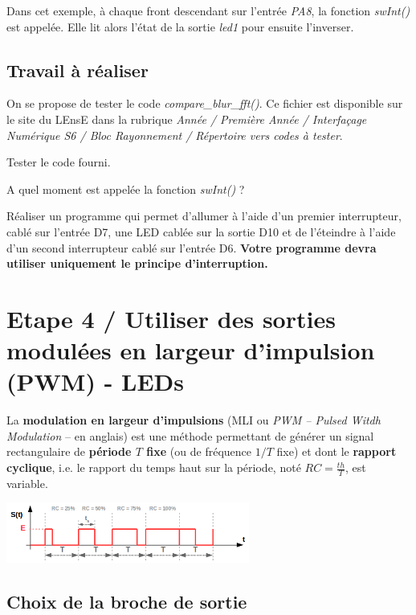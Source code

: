 \documentclass[a4paper,11pt,titlepage]{article} %
\begin{document}
Dans cet exemple, à chaque front descendant sur l'entrée \textsl{PA8}, la fonction \textsl{swInt()} est appelée. Elle lit alors l'état de la sortie \textsl{led1} pour ensuite l'inverser.

\subsection{Travail à réaliser}

On se propose de tester le code \textsl{compare\_blur\_fft()}. Ce fichier est disponible sur le site du LEnsE dans la rubrique \textit{Année / Première Année / Interfaçage Numérique S6 / Bloc Rayonnement / Répertoire vers codes à tester}.

\Manip Tester le code fourni. 

\Quest A quel moment est appelée la fonction \textsl{swInt()} ?

\Manip Réaliser un programme qui permet d'allumer à l'aide d'un premier interrupteur, cablé sur l'entrée D7, une LED cablée sur la sortie D10 et de l'éteindre à l'aide d'un second interrupteur cablé sur l'entrée D6. \textbf{Votre programme devra utiliser uniquement le principe d'interruption.}


\newpage
\section{Etape 4 / Utiliser des sorties modulées en largeur d'impulsion (PWM) - LEDs}

La \textbf{modulation en largeur d'impulsions} (MLI ou \textit{PWM – Pulsed Witdh Modulation} – en anglais) est une méthode permettant de générer un signal rectangulaire de \textbf{période $T$ fixe} (ou de fréquence $1/T$ fixe) et dont le \textbf{rapport cyclique}, i.e. le rapport du temps haut sur la période, noté $RC = \frac{th}{T}$, est variable.

\begin{center}
	\includegraphics[width=0.6\textwidth]{images/MINE_ElecNum_PWM_SignalPrincipe.png}
\end{center}

\subsection{Choix de la broche de sortie}
\end{document}
